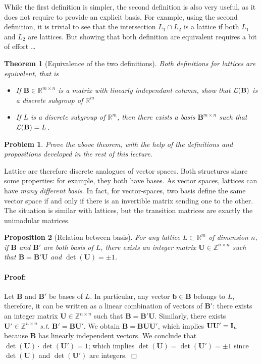 \documentclass[12pt]{article}
\renewcommand{\vec}{\mathbf}
\newcommand{\Z}{\mathbb Z}
\newcommand{\R}{\mathbb R}
\newtheorem{theorem}{Theorem}{\bfseries}{\upshape}
\newtheorem{proposition}[theorem]{Proposition}{\bfseries}{\upshape}
\newtheorem{problem}{Problem}{\bfseries}{\upshape}
\newenvironment{proof}{\paragraph{Proof:} }{\hfill\qed\\}
\newcommand{\qed}{\hfill \ensuremath{\Box}}
\begin{document}
While the first definition is simpler, the second definition is also very useful, as it does not require to provide an explicit basis. For example, using the second definition, it is trivial to see that the intersection $L_1 \cap L_2$ is a lattice if both $L_1$ and $L_2$ are lattices. But showing that both definition are equivalent requires a bit of effort \dots

\begin{theorem}[Equivalence of the two definitions]
Both definitions for lattices are equivalent, that is
\begin{itemize}
  \item[a.] If $\vec B \in \R^{m \times n}$ is a matrix with linearly independant column, show that $\cL(\vec B)$ is a discrete subgroup of $\R^m$
  \item[b.] If $L$ is a discrete subgroup of $\R^m$, then there exists a basis $\vec B^{m \times n}$ such that $\cL(\vec B) = L$.
\end{itemize}
\end{theorem}
\begin{problem}
  Prove the above theorem, with the help of the definitions and propositions developed in the rest of this lecture.
\end{problem}

Lattice are therefore discrete analogues of vector spaces. Both structures share some properties: for example, they both have bases. As vector spaces, lattices can have {\em many different basis}. In fact, for vector-spaces, two basis define the same vector space if and only if there is an invertible matrix sending one to the other. The situation is similar with lattices, but the transition matrices are exactly the unimodular matrices.


\begin{proposition}[Relation between basis]
\label{prop:existence_of_basis}
For any lattice $L \subset \R^m$ of dimension $n$,
if $\vec B$ and $\vec B'$ are both basis of $L$, there exists an integer matrix $\vec U \in \Z^{n \times n}$
such that $\vec B = \vec B' \vec U $ and $\det(\vec U) = \pm 1$.
\end{proposition}
\begin{proof}
Let $\vec B$ and $\vec B'$ be bases of $L$. In particular, any vector $\vec b \in \vec B$ belongs to $L$, therefore, it
can be written as a linear combination of vectors of $\vec B'$: there exists an integer matrix $\vec U \in \Z^{n \times n}$ such 
that $\vec B =  \vec B'\vec U$. Similarly, there exists $\vec U' \in \Z^{n \times n}$ {\em s.t.} $\vec B' = \vec B \vec U'$.
We obtain $\vec B = \vec B \vec U \vec U' $, which implies $\vec U \vec U' = \Id_n$ because $\vec B$ has linearly
independent vectors. We conclude that $\det(\vec U) \cdot \det(\vec U')=1$; which implies $\det(\vec U) = \det(\vec U') = \pm 1$
since $\det(\vec U)$ and $\det(\vec U')$ are integers.
\end{proof}
\end{document}
